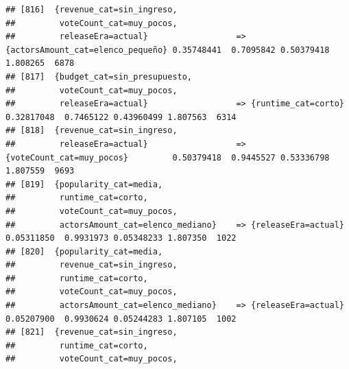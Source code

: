\documentclass[
]{article}
\begin{document}
\begin{verbatim}
## [816]  {revenue_cat=sin_ingreso,                                                                                                
##         voteCount_cat=muy_pocos,                                                                                                
##         releaseEra=actual}                  => {actorsAmount_cat=elenco_pequeño} 0.35748441  0.7095842 0.50379418 1.808265  6878
## [817]  {budget_cat=sin_presupuesto,                                                                                             
##         voteCount_cat=muy_pocos,                                                                                                
##         releaseEra=actual}                  => {runtime_cat=corto}               0.32817048  0.7465122 0.43960499 1.807563  6314
## [818]  {revenue_cat=sin_ingreso,                                                                                                
##         releaseEra=actual}                  => {voteCount_cat=muy_pocos}         0.50379418  0.9445527 0.53336798 1.807559  9693
## [819]  {popularity_cat=media,                                                                                                   
##         runtime_cat=corto,                                                                                                      
##         voteCount_cat=muy_pocos,                                                                                                
##         actorsAmount_cat=elenco_mediano}    => {releaseEra=actual}               0.05311850  0.9931973 0.05348233 1.807350  1022
## [820]  {popularity_cat=media,                                                                                                   
##         revenue_cat=sin_ingreso,                                                                                                
##         runtime_cat=corto,                                                                                                      
##         voteCount_cat=muy_pocos,                                                                                                
##         actorsAmount_cat=elenco_mediano}    => {releaseEra=actual}               0.05207900  0.9930624 0.05244283 1.807105  1002
## [821]  {revenue_cat=sin_ingreso,                                                                                                
##         runtime_cat=corto,                                                                                                      
##         voteCount_cat=muy_pocos,                                                                                                

\end{verbatim}
\end{document}
